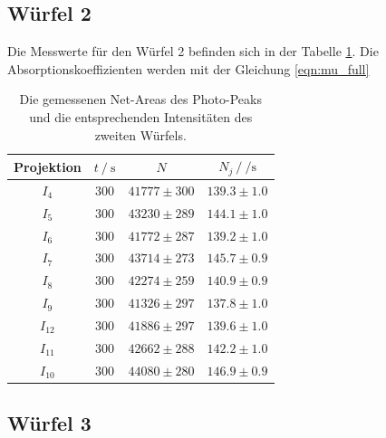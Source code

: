 \subsection{Würfel 2}
Die Messwerte für den Würfel 2 befinden sich in der Tabelle \ref{tab:w2}. Die Absorptionskoeffizienten werden mit der Gleichung \ref{eqn:mu_full}
\begin{table}[H]
  \centering
  \begin{tabular}{c c c c}
    \toprule
     Projektion &  $t \:/\: \si{\second}$ &     $N$ &           $N_j \:/\: \si{\per\second}$ \\
    \midrule
            $I_{  4}$ &   $300$ & $41777 \pm    300$ & $139.3\pm1.0$ \\
            $I_{  5}$ &   $300$ & $43230 \pm    289$ & $144.1\pm1.0$ \\
            $I_{  6}$ &   $300$ & $41772 \pm    287$ & $139.2\pm1.0$ \\
            $I_{  7}$ &   $300$ & $43714 \pm    273$ & $145.7\pm0.9$ \\
            $I_{  8}$ &   $300$ & $42274 \pm    259$ & $140.9\pm0.9$ \\
            $I_{  9}$ &   $300$ & $41326 \pm    297$ & $137.8\pm1.0$ \\
            $I_{ 12}$ &   $300$ & $41886 \pm    297$ & $139.6\pm1.0$ \\
            $I_{ 11}$ &   $300$ & $42662 \pm    288$ & $142.2\pm1.0$ \\
            $I_{ 10}$ &   $300$ & $44080 \pm    280$ & $146.9\pm0.9$ \\
    \bottomrule
    \end{tabular}
  \caption{Die gemessenen Net-Areas des Photo-Peaks und die entsprechenden Intensitäten des zweiten Würfels. }
  \label{tab:w2}
\end{table}

\subsection{Würfel 3}

